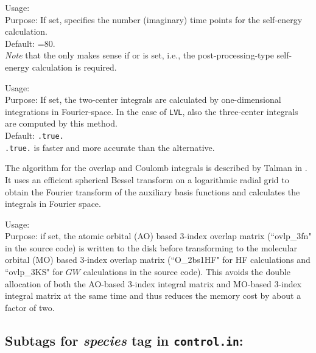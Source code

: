 { \noindent
  Usage:   \\[1.0ex]
  Purpose: If set, specifies the number (imaginary) time points for the self-energy
  calculation.\\[1.0ex]
  Default: =80. \\[1.0ex]
}
\emph{Note} that the  only makes sense if
 or  is set, i.e., the post-processing-type self-energy calculation
is required.

{ \noindent
     Usage:   \\[1.0ex] 
     Purpose: If set, the two-center integrals are calculated by
     one-dimensional integrations in Fourier-space. In the case of
      \texttt{LVL}, also the three-center
     integrals are computed by this method.\\[1.0ex]
     Default: \texttt{.true.} \\
}
 \texttt{.true.} is faster and more accurate than
the alternative.

The algorithm for the overlap and Coulomb integrals is described by Talman in
\cite{Talman03-MCI}.  It uses an efficient spherical Bessel transform on a
logarithmic radial grid
\cite{Talman09-numSBT,Hamilton00-fftlog,Hamilton00-fftlog-www} to obtain the
Fourier transform of the auxiliary basis functions and calculates the
integrals in Fourier space.



{ \noindent
     Usage:  \\[1.0ex] 
     Purpose: if set, the atomic orbital (AO) based 3-index overlap matrix 
     (``ovlp\_3fn" in the source code) is written to the disk before transforming 
     to the molecular orbital (MO) based 3-index overlap matrix (``O\_2bs1HF" for 
     HF calculations and ``ovlp\_3KS" for $GW$ calculations in the source code).
     This avoids the double allocation of both the AO-based 3-index integral matrix 
     and MO-based 3-index integral matrix at the same time and thus reduces the
     memory cost by about a factor of two.
}
\newpage

\subsection*{Subtags for \emph{species} tag in \texttt{control.in}:}

